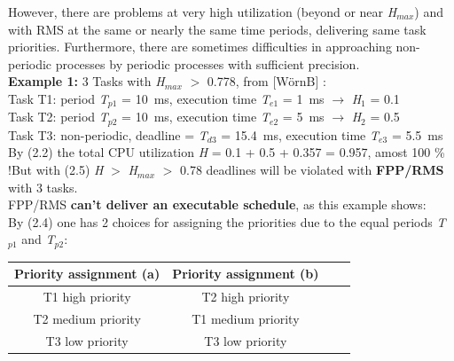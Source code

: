 However, there are problems at very high utilization (beyond or near \textit{H${}_{max}$}) and with RMS at the same or nearly the same time periods, delivering same task priorities. Furthermore, there are sometimes difficulties in approaching non-periodic processes by periodic processes with sufficient precision.\\

\textbf{Example 1:} 3 Tasks with \textit{H}${}_{max}$ $\mathrm{>}$ 0.778, from [W\"{o}rnB] : \\
Task T1: period \textit{T}${}_{p1}$ = 10~ms, execution time \textit{T}${}_{e1}$ = 1~ms $\rightarrow$ \textit{H}${}_{1}$ = 0.1\\
Task T2: period \textit{T}${}_{p2}$ = 10~ms, execution time\textit{ T}${}_{e2}$ = 5~ms $\rightarrow$ \textit{H}${}_{2}$ = 0.5\\
Task T3: non-periodic, deadline = \textit{T}${}_{d3}$ = 15.4~ms, execution time\textit{ T}${}_{e3}$ = 5.5~ms\\

By (2.2) the total CPU utilization \textit{H} = 0.1 + 0.5 + 0.357 = 0.957, amost 100 \% !But with (2.5) \textit{H} $\mathrm{>}$ \textit{H}${}_{max}$ $\mathrm{>}$ 0.78 deadlines will be violated with \textbf{FPP/RMS} with 3 tasks.\\ 

FPP/RMS \textbf{can't deliver an executable schedule}, as this example shows:\\

By (2.4) one has 2 choices for assigning the priorities due to the equal periods \textit{T}${}_{p1}$\textit{ }and \textit{T}${}_{p2}$:\\

\begin{table}[h!]
\setlength{\tabcolsep}{10pt} %
\renewcommand{\arraystretch}{1.5} %
\small
\centering
 \begin{tabular}{|c|c|c|c|} 
 \hline
 \textbf{Priority assignment (a)} & \textbf{Priority assignment (b)} \\ [0.1ex] 
 \hline
 T1  high priority & T2  high  priority \\ 
 \hline
 T2  medium priority & T1  medium priority \\ 
  \hline
 T3  low priority & T3  low priority  \\ 
 \hline
 \end{tabular}
 \label{Intrinsic}
\end{table}


